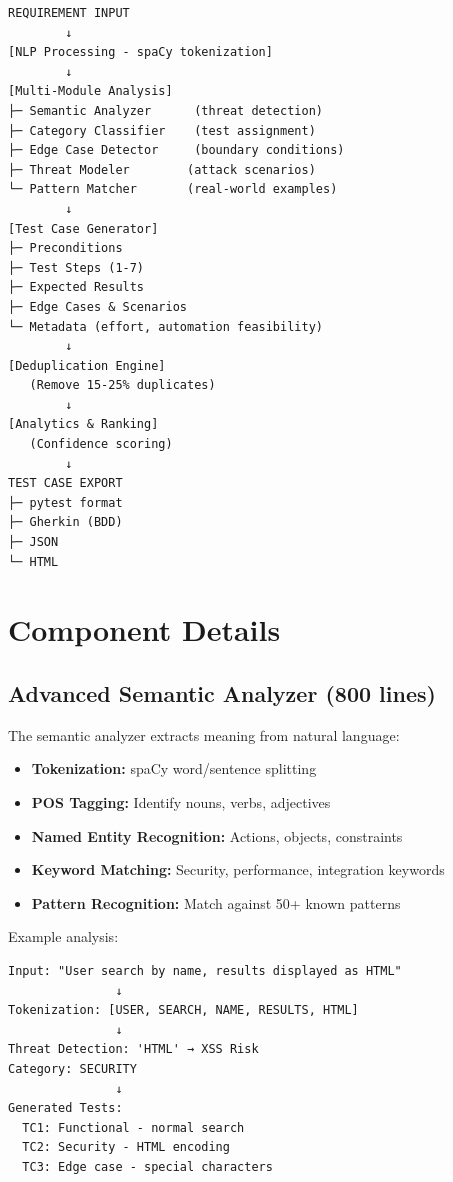 \documentclass[12pt,oneside]{report}
\begin{document}
\begin{verbatim}
REQUIREMENT INPUT
        ↓
[NLP Processing - spaCy tokenization]
        ↓
[Multi-Module Analysis]
├─ Semantic Analyzer      (threat detection)
├─ Category Classifier    (test assignment)
├─ Edge Case Detector     (boundary conditions)
├─ Threat Modeler        (attack scenarios)
└─ Pattern Matcher       (real-world examples)
        ↓
[Test Case Generator]
├─ Preconditions
├─ Test Steps (1-7)
├─ Expected Results
├─ Edge Cases & Scenarios
└─ Metadata (effort, automation feasibility)
        ↓
[Deduplication Engine]
   (Remove 15-25% duplicates)
        ↓
[Analytics & Ranking]
   (Confidence scoring)
        ↓
TEST CASE EXPORT
├─ pytest format
├─ Gherkin (BDD)
├─ JSON
└─ HTML
\end{verbatim}

\section{Component Details}

\subsection{Advanced Semantic Analyzer (800 lines)}

The semantic analyzer extracts meaning from natural language:

\begin{itemize}
    \item \textbf{Tokenization:} spaCy word/sentence splitting
    \item \textbf{POS Tagging:} Identify nouns, verbs, adjectives
    \item \textbf{Named Entity Recognition:} Actions, objects, constraints
    \item \textbf{Keyword Matching:} Security, performance, integration keywords
    \item \textbf{Pattern Recognition:} Match against 50+ known patterns
\end{itemize}

Example analysis:
\begin{verbatim}
Input: "User search by name, results displayed as HTML"
               ↓
Tokenization: [USER, SEARCH, NAME, RESULTS, HTML]
               ↓
Threat Detection: 'HTML' → XSS Risk
Category: SECURITY
               ↓
Generated Tests:
  TC1: Functional - normal search
  TC2: Security - HTML encoding
  TC3: Edge case - special characters
\end{verbatim}
\end{document}
